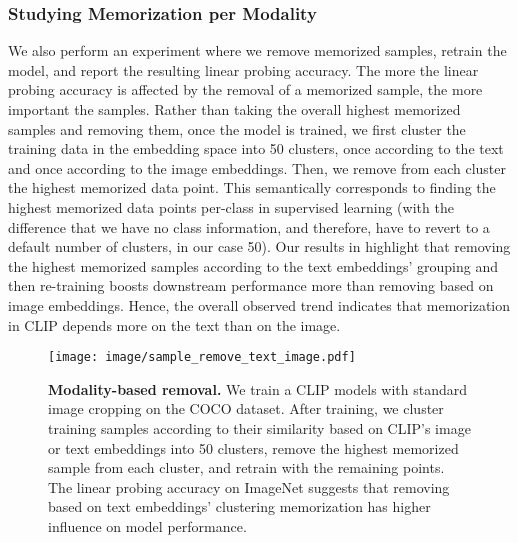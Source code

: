 \subsubsection{Studying Memorization per Modality}
\label{app:modality}
We also perform an experiment where we remove memorized samples, retrain the model, and report the resulting linear probing accuracy.
The more the linear probing accuracy is affected by the removal of a memorized sample, the more important the samples.
Rather than taking the overall highest memorized samples and removing them, once the model is trained, we first cluster the training data in the embedding space into 50 clusters, once according to the text and once according to the image embeddings.
Then, we remove from each cluster the highest memorized data point.
This semantically corresponds to finding the highest memorized data points per-class in supervised learning (with the difference that we have no class information, and therefore, have to revert to a default number of clusters, in our case 50).
Our results in  highlight that removing the highest memorized samples according to the text embeddings' grouping and then re-training boosts downstream performance more than removing based on image embeddings. 
Hence, the overall observed trend indicates that memorization in CLIP depends more on the text than on the image.
\begin{figure}[h]
    \centering
    \texttt{[image: image/sample\_remove\_text\_image.pdf]}
    \caption{\textbf{Modality-based removal.} We train a CLIP models with standard image cropping on the COCO dataset. 
    After training, we cluster training samples according to their similarity based on CLIP's image or text embeddings into 50 clusters, remove the highest memorized sample from each cluster, and retrain with the remaining points. The linear probing accuracy on ImageNet suggests that removing based on text embeddings' clustering memorization has higher influence on model performance.}
    \label{fig:modality}
\end{figure}




